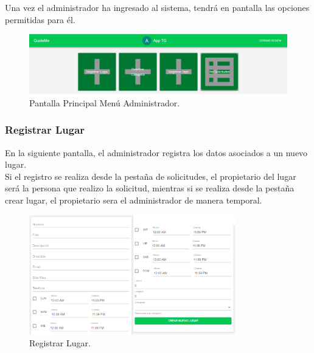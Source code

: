 \documentclass[12pt,letterpaper,openany]{book}
\begin{document}
Una vez el administrador ha ingresado al sistema, tendrá en pantalla las opciones permitidas para él.

\begin{figure}[H]
\begin{center}
\includegraphics[width=13cm]{./imagenes/admin/p_principal}
\caption{Pantalla Principal Menú Administrador.}
\end{center}
\end{figure}

\subsubsection{Registrar Lugar}
En la siguiente pantalla, el administrador registra los datos asociados a un nuevo lugar. \\
Si el registro se realiza desde la pestaña de solicitudes, el propietario del lugar será la persona que realizo la solicitud, mientras si se realiza desde la pestaña crear lugar, el propietario sera el administrador de manera temporal.

\begin{figure}[H]
\begin{center}
\includegraphics[width=9cm]{./imagenes/admin/crear_lugar}
\caption{Registrar Lugar.}
\end{center}
\end{figure}
\end{document}
